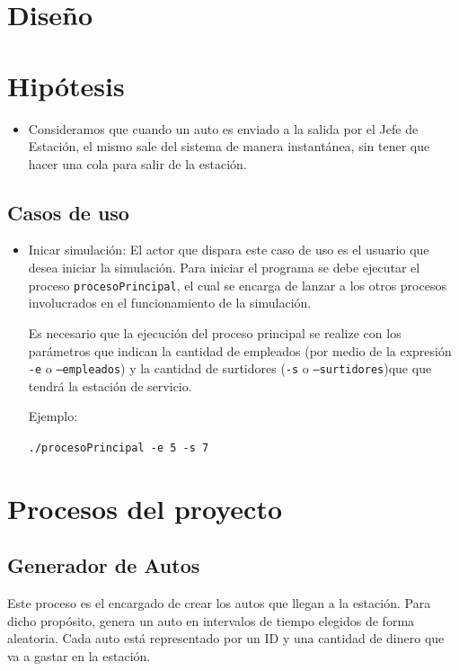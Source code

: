 \documentclass[12pt,a4paper,spanish]{article}
\begin{document}

\newpage
\tableofcontents
\newpage
\section{Diseño}

\section{Hipótesis}

\begin{itemize}
	\item Consideramos que cuando un auto es enviado a la salida por el Jefe de Estación,
	el mismo sale del sistema de manera instantánea, sin tener que hacer una cola
	para salir de la estación.
\end{itemize}

\subsection{Casos de uso}

\begin{itemize}
	\item Inicar simulación: El actor que dispara este caso de uso es el usuario
	que desea iniciar la simulación. Para iniciar el programa se debe ejecutar el
	proceso \texttt{procesoPrincipal}, el cual se encarga de
	lanzar a los otros procesos involucrados en el funcionamiento de la simulación.

	Es necesario que la ejecución del proceso principal se realize con los parámetros
	que indican la cantidad de empleados (por medio de la expresión \texttt{-e} o \texttt{--empleados})
	y la cantidad de surtidores (\texttt{-s} o \texttt{--surtidores})que que tendrá la
	estación de servicio.

	Ejemplo:

	\texttt{./procesoPrincipal -e 5 -s 7}
\end{itemize}

\section{Procesos del proyecto}

	\subsection{Generador de Autos}
		
		Este proceso es el encargado de crear los autos que llegan a la estación. Para
		dicho propósito, genera un auto en intervalos de tiempo elegidos de forma aleatoria. 
		Cada auto está representado por un ID y una cantidad de dinero que va a gastar en la estación.
\end{document}
